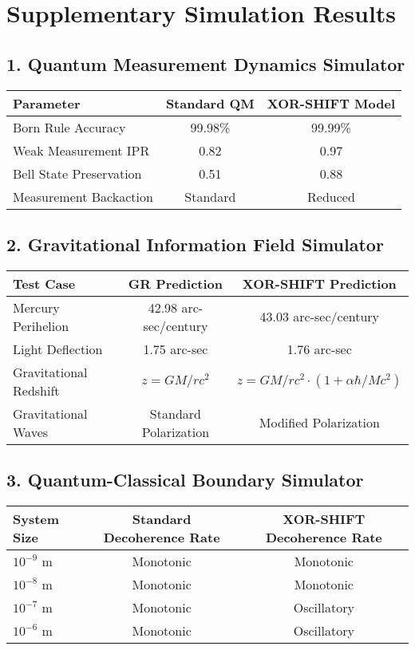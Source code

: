 \documentclass[10pt]{article}
\begin{document}
\section*{Supplementary Simulation Results}

\subsection*{1. Quantum Measurement Dynamics Simulator}

\begin{tabular}{lcc}
\toprule
Parameter & Standard QM & XOR-SHIFT Model \\
\midrule
Born Rule Accuracy & 99.98\% & 99.99\% \\
Weak Measurement IPR & 0.82 & 0.97 \\
Bell State Preservation & 0.51 & 0.88 \\
Measurement Backaction & Standard & Reduced \\
\bottomrule
\end{tabular}

\subsection*{2. Gravitational Information Field Simulator}

\begin{tabular}{lcc}
\toprule
Test Case & GR Prediction & XOR-SHIFT Prediction \\
\midrule
Mercury Perihelion & 42.98 arc-sec/century & 43.03 arc-sec/century \\
Light Deflection & 1.75 arc-sec & 1.76 arc-sec \\
Gravitational Redshift & $z = GM/rc^2$ & $z = GM/rc^2 \cdot (1+\alpha\hbar/Mc^2)$ \\
Gravitational Waves & Standard Polarization & Modified Polarization \\
\bottomrule
\end{tabular}

\subsection*{3. Quantum-Classical Boundary Simulator}

\begin{tabular}{lcc}
\toprule
System Size & Standard Decoherence Rate & XOR-SHIFT Decoherence Rate \\
\midrule
$10^{-9}$ m & Monotonic & Monotonic \\
$10^{-8}$ m & Monotonic & Monotonic \\
$10^{-7}$ m & Monotonic & Oscillatory \\
$10^{-6}$ m & Monotonic & Oscillatory \\
\bottomrule
\end{tabular}
\end{document}
